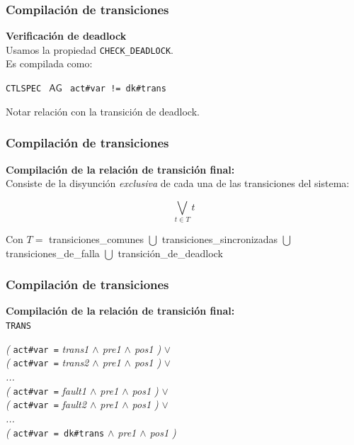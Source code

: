 \documentclass[serif]{beamer}
\newcommand{\AG}{\mathop{\mathsf{AG}}}
\begin{document}
\begin{frame}
\frametitle{Compilación de transiciones}
\textbf{\Large Verificación de deadlock}\\[0.3cm]
Usamos la propiedad \texttt{CHECK\_DEADLOCK}.\\[0.3cm]
Es compilada como:
\begin{framed}
\texttt{CTLSPEC~$\AG$~act\#var~!=~dk\#trans}
\end{framed}
Notar relación con la transición de deadlock.
\end{frame}



\begin{frame}
\frametitle{Compilación de transiciones}
\textbf{\Large Compilación de la relación de transición final:}\\[0.3cm]
Consiste de la disyunción \textit{exclusiva} de cada una de las 
transiciones del sistema:
\begin{framed}
$$\bigvee_{t \in T} t $$
\end{framed}
Con $T =$ transiciones\_comunes $\bigcup$ transiciones\_sincronizadas 
$\bigcup$ transiciones\_de\_falla $\bigcup$ transición\_de\_deadlock
\end{frame}


\begin{frame}
\frametitle{Compilación de transiciones}
\textbf{\large Compilación de la relación de transición final:}\\[0.5cm]
\texttt{TRANS}\\[0.3cm]
\hspace{0.1\textwidth}
\begin{minipage}{0.85\textwidth}
\textit{(} \texttt{act\#var =} \textit{trans1 $\wedge$ pre1 $\wedge$ pos1 )}  $\vee$\\
\textit{(} \texttt{act\#var =} \textit{trans2 $\wedge$ pre1 $\wedge$ pos1 )}  $\vee$\\
\textit{\hspace{75pt}...}\\
\textit{(} \texttt{act\#var =} \textit{fault1 $\wedge$ pre1 $\wedge$ pos1 )}  $\vee$\\
\textit{(} \texttt{act\#var =} \textit{fault2 $\wedge$ pre1 $\wedge$ pos1 )}  $\vee$\\
\textit{\hspace{75pt}...}\\
\textit{(} \texttt{act\#var = dk\#trans} \textit{$\wedge$ pre1 $\wedge$ pos1 )}
\end{minipage}
\end{frame}
\end{document}
